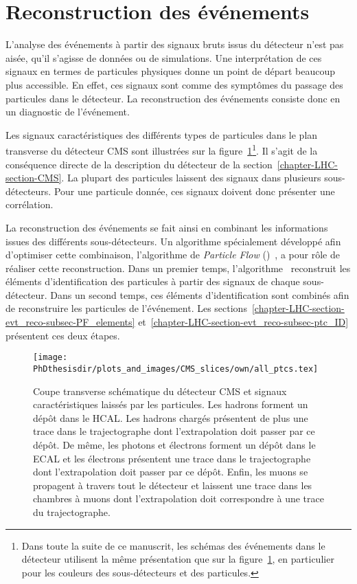 \section{Reconstruction des événements}\label{chapter-LHC-section-evt_reco}
L'analyse des événements à partir des signaux bruts issus du détecteur n'est pas aisée, qu'il s'agisse de données ou de simulations.
Une interprétation de ces signaux en termes de particules physiques donne un point de départ beaucoup plus accessible.
En effet, ces signaux sont comme des \og symptômes \fg{} du passage des particules dans le détecteur.
La reconstruction des événements consiste donc en un \og diagnostic \fg{} de l'événement.
\par Les signaux caractéristiques des différents types de particules dans le plan transverse du détecteur CMS sont illustrées sur la figure~\ref{fig-chapter-LHC-section-evt_reco-cms_slice}\footnote{Dans toute la suite de ce manuscrit, les schémas des événements dans le détecteur utilisent la même présentation que sur la figure~\ref{fig-chapter-LHC-section-evt_reco-cms_slice}, en particulier pour les couleurs des sous-détecteurs et des particules.}.
Il s'agit de la conséquence directe de la description du détecteur de la section~\ref{chapter-LHC-section-CMS}.
La plupart des particules laissent des signaux dans plusieurs sous-détecteurs.
Pour une particule donnée, ces signaux doivent donc présenter une corrélation.
\par La reconstruction des événements se fait ainsi en combinant les informations issues des différents sous-détecteurs.
Un algorithme spécialement développé afin d'optimiser cette combinaison, l'algorithme de \emph{Particle Flow} (\PF)~\cite{particle-flow,Dordevic_particle_flow}, a pour rôle de réaliser cette reconstruction. Dans un premier temps, l'algorithme \PF\ reconstruit les éléments d'identification des particules à partir des signaux de chaque sous-détecteur.
Dans un second temps, ces éléments d'identification sont combinés afin de reconstruire les particules de l'événement.
Les sections~\ref{chapter-LHC-section-evt_reco-subsec-PF_elements} et~\ref{chapter-LHC-section-evt_reco-subsec-ptc_ID} présentent ces deux étapes.
\begin{figure}[h]
\texttt{[image: \\PhDthesisdir/plots\_and\_images/CMS\_slices/own/all\_ptcs.tex]}
\caption[Coupe transverse schématique du détecteur CMS.]{Coupe transverse schématique du détecteur CMS et signaux caractéristiques laissés par les particules. Les hadrons forment un dépôt dans le HCAL. Les hadrons chargés présentent de plus une trace dans le trajectographe dont l'extrapolation doit passer par ce dépôt. De même, les photons et électrons forment un dépôt dans le ECAL et les électrons présentent une trace dans le trajectographe dont l'extrapolation doit passer par ce dépôt. Enfin, les muons se propagent à travers tout le détecteur et laissent une trace dans les chambres à muons dont l'extrapolation doit correspondre à une trace du trajectographe.}
\label{fig-chapter-LHC-section-evt_reco-cms_slice}
\end{figure}
\newpage



